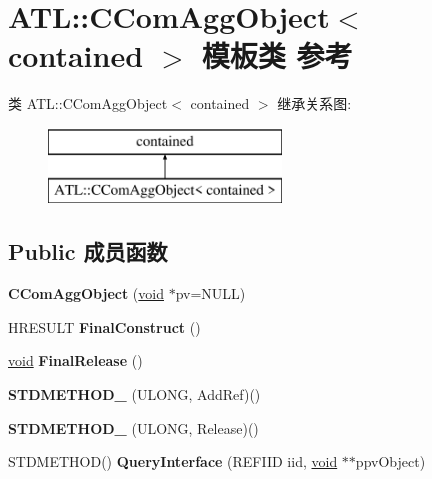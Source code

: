 \hypertarget{class_a_t_l_1_1_c_com_agg_object}{}\section{A\+TL\+:\+:C\+Com\+Agg\+Object$<$ contained $>$ 模板类 参考}
\label{class_a_t_l_1_1_c_com_agg_object}
类 A\+TL\+:\+:C\+Com\+Agg\+Object$<$ contained $>$ 继承关系图\+:\begin{figure}[H]
\begin{center}
\leavevmode
\includegraphics[height=2.000000cm]{class_a_t_l_1_1_c_com_agg_object}
\end{center}
\end{figure}
\subsection*{Public 成员函数}
\begin{DoxyCompactItemize}
\item 
\mbox{\label{class_a_t_l_1_1_c_com_agg_object_a3f1d9567f6eb95208ae1f9bb0f413719}} 
{\bfseries C\+Com\+Agg\+Object} (\hyperlink{interfacevoid}{void} $\ast$pv=N\+U\+LL)
\item 
\mbox{\label{class_a_t_l_1_1_c_com_agg_object_a486209d3942067ec4b5e1d0d300c34d2}} 
H\+R\+E\+S\+U\+LT {\bfseries Final\+Construct} ()
\item 
\mbox{\label{class_a_t_l_1_1_c_com_agg_object_a0c94b384a0e2c0d151ec374916f13b43}} 
\hyperlink{interfacevoid}{void} {\bfseries Final\+Release} ()
\item 
\mbox{\label{class_a_t_l_1_1_c_com_agg_object_ab3ede76bdaca7a75773ef4dab8f2e13d}} 
{\bfseries S\+T\+D\+M\+E\+T\+H\+O\+D\+\_\+} (U\+L\+O\+NG, Add\+Ref)()
\item 
\mbox{\label{class_a_t_l_1_1_c_com_agg_object_a1c725d976df5d52edaa3963903359ee4}} 
{\bfseries S\+T\+D\+M\+E\+T\+H\+O\+D\+\_\+} (U\+L\+O\+NG, Release)()
\item 
\mbox{\label{class_a_t_l_1_1_c_com_agg_object_ae6d99ec5327e7140ac5f2e3db9187b13}} 
S\+T\+D\+M\+E\+T\+H\+OD() {\bfseries Query\+Interface} (R\+E\+F\+I\+ID iid, \hyperlink{interfacevoid}{void} $\ast$$\ast$ppv\+Object)
\end{DoxyCompactItemize}
